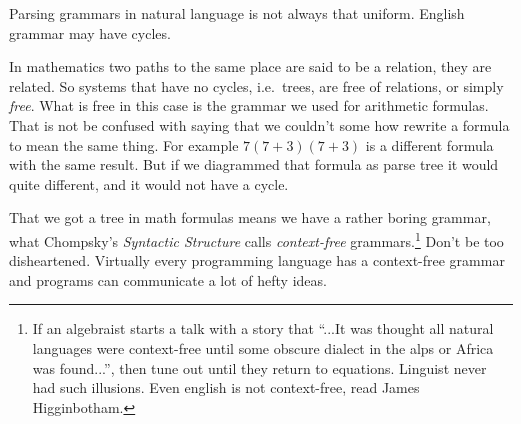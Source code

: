 Parsing grammars in natural language is not always that
uniform.  English grammar may have cycles.
\begin{center}
\end{center}
In mathematics two paths to the same place are said to be a relation, 
they are related.  So systems that have no cycles, i.e.\ trees, are 
free of relations, or simply \emph{free}.  What is free in this case 
is the grammar we used for arithmetic formulas.  That is not be confused 
with saying that we couldn't some how rewrite a formula to mean the same thing.
For example $7(7+3)(7+3)$ is a different formula with the same result.
But if we diagrammed that formula as parse tree it would quite different,
and it would not have a cycle.

That we got a tree in math formulas means we have a rather boring grammar, 
what Chompsky's \emph{Syntactic Structure} calls
\emph{context-free} grammars.\footnote{
    If an algebraist starts a talk with a story that ``...It was thought  all natural 
    languages were context-free until some obscure dialect in the alps or Africa was found...'', 
    then tune out until they return to equations.  
    Linguist never had such illusions. Even english is not context-free, read  James Higginbotham.} 
Don't be too disheartened.  Virtually every programming language has a 
context-free grammar and programs can communicate a lot of hefty ideas. 

